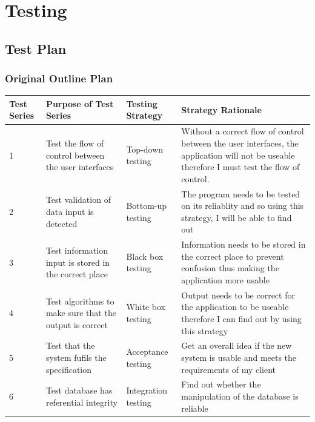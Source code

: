 \chapter{Testing}

\section{Test Plan}

\begin{landscape}
\subsection{Original Outline Plan}

\begin{center}
    \begin{tabular}{|p{2cm}|p{5cm}|p{5cm}|p{4cm}|}
        \hline
        \textbf{Test Series} & \textbf{Purpose of Test Series} & \textbf{Testing Strategy} & \textbf{Strategy Rationale}\\ \hline
         1 & Test the flow of control between the user interfaces & Top-down testing & Without a correct flow of control between the user interfaces, the application will not be useable therefore I must test the flow of control.  \\ \hline
	2 & Test validation of data input is detected & Bottom-up testing & The program needs to be tested on its reliablity and so using this strategy, I will be able to find out \\ \hline
	3 & Test information input is stored in the correct place & Black box testing & Information needs to be stored in the correct place to prevent confusion thus making the application more usable \\ \hline
	4 & Test algorithms to make sure that the output is correct & White box testing & Output needs to be correct for the application to be useable therefore I can find out by using this strategy \\ \hline
	5 & Test that the system fufils the specification & Acceptance testing & Get an overall idea if the new system is usable and meets the requirements of my client  \\ \hline
	6 & Test database has referential integrity & Integration testing &Find out whether the manipulation of the database is reliable  \\ \hline
    \end{tabular}
\end{center}


\end{landscape}

